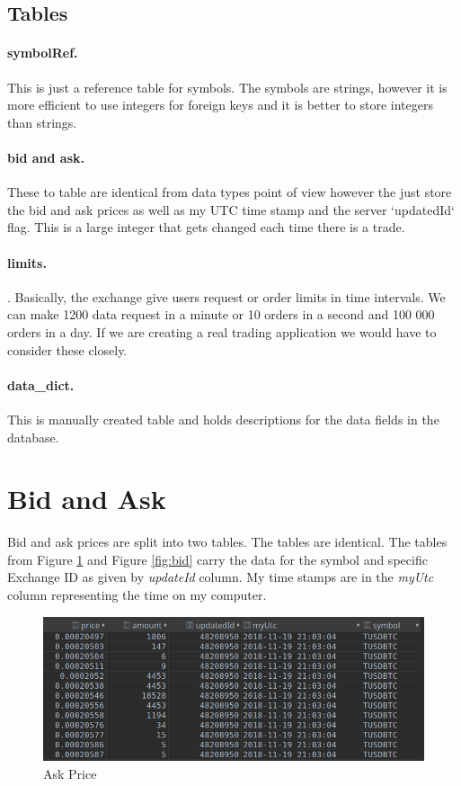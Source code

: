 \documentclass[12pt]{article}
\begin{document}
\subsection*{Tables}
\paragraph*{symbolRef.} This is just a reference table for symbols. The symbols are strings, however it is more efficient to use integers for foreign keys and it is better to store integers than strings.
\paragraph*{bid and ask.} These to table are identical from data types point of view however the just store the bid and ask prices as well as my UTC time stamp and the server `updatedId` flag. This is a large integer that gets changed each time there is a trade.
\paragraph*{limits.}. Basically, the exchange give users request or order limits in time intervals. We can make 1200 data request in a minute or 10 orders in a second and 100 000 orders in a day. If we are creating a real trading application we would have to consider these closely.
\paragraph*{data\_dict.} This is manually created table and holds descriptions for the data fields in the database.

\section*{Bid and Ask}
Bid and ask prices are split into two tables. The tables are identical. The tables from Figure \ref{fig:ask} and Figure \ref{fig:bid} carry the data for the symbol and specific Exchange ID as given by \textit{updateId} column. My time stamps are in the \textit{myUtc} column representing the time on my computer.

\begin{figure}[h!]
	\centering
  \includegraphics[scale=0.3]{ask.png}
  \caption{Ask Price}
  \label{fig:ask}
\end{figure}
\end{document}
